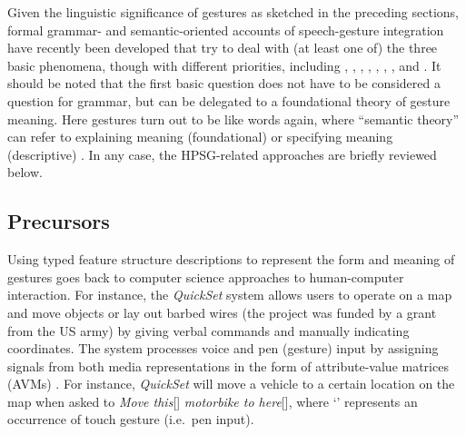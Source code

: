 \documentclass[output=paper]{langsci/langscibook}
\begin{document}
Given the linguistic significance of gestures as sketched in the preceding sections, formal grammar- and semantic-oriented accounts of speech-gesture integration have recently been developed that try to deal with (at least one of) the three basic phenomena, though with different priorities, including
%
\citet{Alahverdzhieva:2013}, 
%
\citet{Alahverdzhieva:Lascarides:2010},
%
\cite{Ebert:2014:a},
%
\citet{Giorgolo:2010},
%
\citet{Giorgolo:Asudeh:2011},
%
\citet{Luecking:2013:a,Luecking:2016},
%
\citet{Rieser:2008,Rieser:2011,Rieser:2015},
%
\citet{Rieser:Poesio:2009} and
%
\citet{Schlenker:2018}.
%
It should be noted that the first basic question does not have to be considered a question for grammar, but can be delegated to a foundational theory of gesture meaning.
%
Here gestures turn out to be like words again, where \enquote{semantic theory} can refer to explaining meaning (foundational) or specifying meaning (descriptive) \citep[]{Lewis:1970}.
%
In any case, the HPSG-related approaches are briefly reviewed below.
%



\subsection{Precursors} 
\label{sec:precursors}

Using typed feature structure descriptions to represent the form and meaning of gestures goes back to computer science approaches to human-computer interaction. %
%
For instance, the \textit{QuickSet} system  \citep{Cohen:et:al:1997} allows users to operate on a map and move objects or lay out barbed wires (the project was funded by a grant from the US army) by giving verbal commands and manually indicating coordinates.
%
The system processes voice and pen (gesture) input by assigning signals from both media representations in the form of attribute-value matrices (AVMs) \citep{Johnston:1998,Johnston:et:al:1997}.
%
For instance, \textit{QuickSet} will move a vehicle to a certain location on the map when asked to \emph{Move this}[\Pointing] \emph{motorbike to here}[\Pointing], where \enquote*{\Pointing} represents an occurrence of touch gesture (i.e.\ pen input). 
\end{document}
